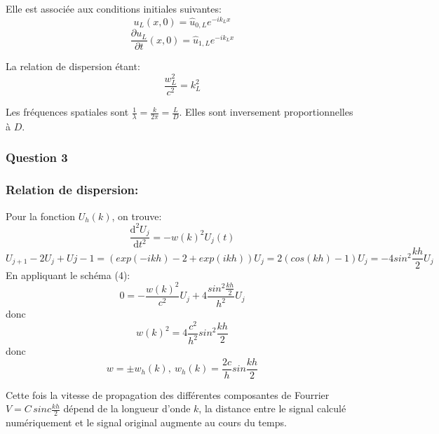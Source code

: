 \documentclass{article}
\newcommand{\Q}[1]{\subsubsection*{Question #1}}
\newcommand\Coord[2]{\ensuremath{\begin{pmatrix}
 #1 \\
 #2 
\end{pmatrix}}}
\begin{document}

 Elle est associée aux conditions initiales suivantes:
$$ u_L(x, 0) = \hat{u}_{0,L} e^{-i k_L x} $$
$$ \frac{ \partial u_L }{ \partial t }(x, 0) = \hat{u}_{1,L} e^{-i k_L x} $$

La relation de dispersion étant:
$$\frac{w_L^2}{c^2}= k_L^2$$

Les fréquences spatiales sont $ \frac{1}{ \lambda } = \frac{k}{2 \pi } = \frac{L}{D}$. Elles sont inversement proportionnelles à $D$.

\Q{3}
\subsubsection*{Relation de dispersion:}

Pour la fonction $U_h(k)$, on trouve:
$$ \frac{\mathrm{d}^2 U_j} {\mathrm{d}t^2} = -w(k)^2 U_j(t) $$
$$ U_{j+1} - 2U_j + U{j-1} = (exp(-ikh)  - 2 + exp(ikh)) U_j = 2(cos(kh)-1) U_j = -4sin^2 \frac{kh}{2} U_j $$
En appliquant le schéma (4): 
$$ 0 = -\frac{w(k)^2}{c^2} U_j + 4\frac{sin^2 \frac{kh}{2} }{h^2} U_j$$
donc 
$$ w(k)^2 = 4\frac{c^2}{h^2}sin^2 \frac{kh}{2} $$
donc
$$ w = \pm w_h(k), \ w_h(k) = \frac{2c}{h}sin \frac{kh}{2}$$

Cette fois la vitesse de propagation des différentes composantes de Fourrier $ V = C\,sinc \frac{kh}{2}$ dépend de la longueur d'onde $k$, la distance entre le signal calculé numériquement et le signal original augmente au cours du temps.
\end{document}
